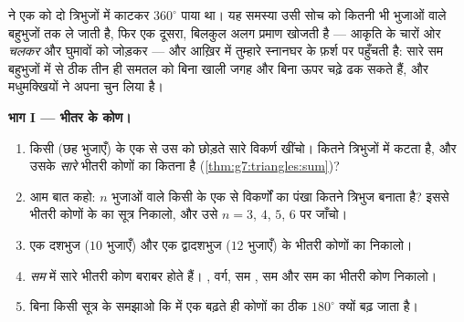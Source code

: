 \begin{problem}
\label{pb:g7:triangles:1}
 ने एक  को दो त्रिभुजों में
काटकर $360^\circ$ पाया था। यह समस्या उसी सोच को कितनी भी भुजाओं
वाले बहुभुजों तक ले जाती है, फिर एक दूसरा, बिलकुल अलग प्रमाण खोजती
है --- आकृति के चारों ओर \emph{चलकर} और घुमावों को जोड़कर --- और
आख़िर में तुम्हारे स्नानघर के फ़र्श पर पहुँचती है: सारे सम बहुभुजों
में से ठीक तीन ही समतल को बिना खाली जगह और बिना ऊपर चढ़े ढक सकते
हैं, और मधुमक्खियों ने अपना चुन लिया है।

\medskip
\noindent\textbf{भाग I --- भीतर के कोण।}
\begin{enumerate}
  \item किसी  (छह भुजाएँ) के एक  से उस  को छोड़ते
        सारे विकर्ण खींचो।  कितने त्रिभुजों में कटता है, और
        उसके \emph{सारे} भीतरी कोणों का  कितना है
        (\cref{thm:g7:triangles:sum})?
  \item आम बात कहो: $n$ भुजाओं वाले किसी  के एक  से
        विकर्णों का पंखा कितने त्रिभुज बनाता है? इससे भीतरी कोणों
        के  का सूत्र निकालो, और उसे $n = 3$, $4$, $5$, $6$
        पर जाँचो।
  \item एक दशभुज ($10$ भुजाएँ) और एक द्वादशभुज ($12$ भुजाएँ) के
        भीतरी कोणों का  निकालो।
  \item \emph{सम}  में सारे भीतरी कोण बराबर होते हैं।
        , वर्ग, सम , सम  और सम 
        का भीतरी कोण निकालो।
  \item बिना किसी सूत्र के समझाओ कि  में एक  बढ़ते ही
        कोणों का  ठीक $180^\circ$ क्यों बढ़ जाता है।
\end{enumerate}


\end{problem}
